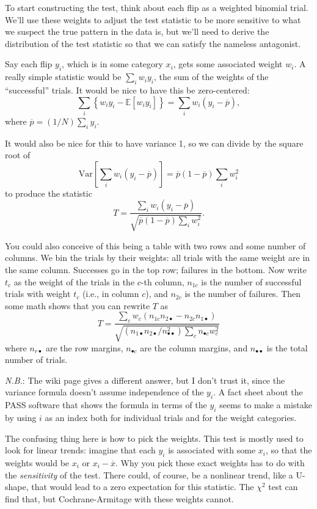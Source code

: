 To start constructing the test, think about each flip as a weighted
binomial trial. We'll use these weights to adjust the test statistic to
be more sensitive to what we suspect the true pattern in the data is,
but we'll need to derive the distribution of the test statistic so that
we can satisfy the nameless antagonist.

Say each flip \(y_i\), which is in some category \(x_i\), gets some
associated weight \(w_i\). A really simple statistic would be
\(\sum_i w_i y_i\), the sum of the weights of the ``successful'' trials.
It would be nice to have this be zero-centered: \[
\sum_i \left\{ w_i y_i - \mathbb{E}\left[ w_i y_i \right] \right\} = \sum_i w_i (y_i - \overline{p}),
\] where \(\overline{p} = (1/N)\sum_i y_i\).

It would also be nice for this to have variance 1, so we can divide by
the square root of \[
\mathrm{Var}\left[ \sum_i w_i (y_i - \overline{p}) \right] = \overline{p} (1-\overline{p}) \sum_i w_i^2
\] to produce the statistic \[
T = \frac{\sum_i w_i (y_i - \overline{p})}{\sqrt{\overline{p} (1-\overline{p}) \sum_i w_i^2}}.
\]

You could also conceive of this being a table with two rows and some
number of columns. We bin the trials by their weights: all trials with
the same weight are in the same column. Successes go in the top row;
failures in the bottom. Now write \(t_c\) as the weight of the trials in
the \(c\)-th column, \(n_{1c}\) is the number of successful trials with
weight \(t_c\) (i.e., in column \(c\)), and \(n_{2c}\) is the number of
failures. Then some math shows that you can rewrite \(T\) as \[
T = \frac{\sum_c w_c (n_{1c} n_{2\bullet} - n_{2c} n_{1\bullet})}{\sqrt{(n_{1\bullet} n_{2\bullet} / n_{\bullet\bullet}^2) \sum_c n_{\bullet c} w_c^2}}
\] where \(n_{r\bullet}\) are the row margins, \(n_{\bullet c}\) are the
column margins, and \(n_{\bullet\bullet}\) is the total number of
trials.

\emph{N.B.}: The wiki page gives a different answer, but I don't trust
it, since the variance formula doesn't assume independence of the
\(y_i\). A fact sheet about the PASS software that shows the formula in
terms of the \(y_i\) seems to make a mistake by using \(i\) as an index
both for individual trials and for the weight categories.

The confusing thing here is how to pick the weights. This test is mostly
used to look for linear trends: imagine that each \(y_i\) is associated
with some \(x_i\), so that the weights would be \(x_i\) or
\(x_i - \overline{x}\). Why you pick these exact weights has to do with
the \emph{sensitivity} of the test. There could, of course, be a
nonlinear trend, like a U-shape, that would lead to a zero expectation
for this statistic. The \(\chi^2\) test can find that, but
Cochrane-Armitage with these weights cannot.

